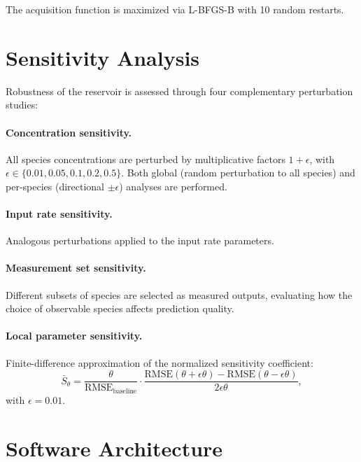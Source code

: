 \documentclass[11pt,twocolumn]{article}
\newcommand{\rmse}{\mathrm{RMSE}}
\begin{document}
The acquisition function is maximized via L-BFGS-B with 10 random restarts.

\section{Sensitivity Analysis}
\label{sec:sensitivity}

Robustness of the reservoir is assessed through four complementary
perturbation studies:

\paragraph{Concentration sensitivity.}
All species concentrations are perturbed by multiplicative factors
$1 + \epsilon$, with
$\epsilon \in \{0.01, 0.05, 0.1, 0.2, 0.5\}$.  Both global (random
perturbation to all species) and per-species (directional $\pm\epsilon$)
analyses are performed.

\paragraph{Input rate sensitivity.}
Analogous perturbations applied to the input rate parameters.

\paragraph{Measurement set sensitivity.}
Different subsets of species are selected as measured outputs, evaluating how
the choice of observable species affects prediction quality.

\paragraph{Local parameter sensitivity.}
Finite-difference approximation of the normalized sensitivity coefficient:
\begin{equation}
  \bar{S}_\theta = \frac{\theta}{\rmse_\text{baseline}} \cdot
    \frac{\rmse(\theta + \epsilon\theta) - \rmse(\theta - \epsilon\theta)}{2\epsilon\theta},
\end{equation}
with $\epsilon = 0.01$.

\section{Software Architecture}
\label{sec:software}
\end{document}
